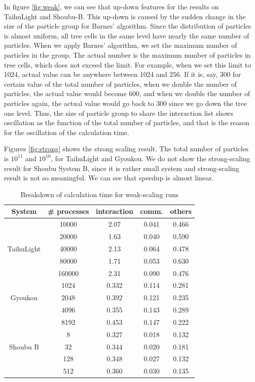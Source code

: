 \documentclass[Afour,sageh,times]{sagej}
\newcommand{\rev}[1]{{#1}}
\begin{document}
\rev{In figure \ref{fig:weak}, we can see that up-down features for
  the results on TaihuLight and Shoubu-B. This up-down is caused by
  the sudden change in the size of the particle group for Barnes'
  algorithm. Since the distribution of particles is almost uniform,
  all tree cells in the same level have nearly the same number of
  particles.  When we apply Barnes' algorithm, we set the maximum
  number of particles in the group.  The actual number is the maximum
  number of particles in tree cells, which does not exceed the limit.
  For example, when we set this limit to 1024, actual value can be
  anywhere between 1024 and 256. If it is, say, 300 for certain value
  of the total number of particles, when we double the number of
  particles, the actual value would become 600, and when we double the
  number of particles again, the actual value would go back to 300
  since we go down the tree one level. Thus, the size of particle
  group to share the interaction list shows oscillation as the
  function of the total number of particles, and that is the reason
  for the oscillation of the calculation time.}

Figures \ref{fig:strong} shows the strong scaling result.  The total
number of particles is $10^{11}$ and $10^{10}$, for TaihuLight and
Gyoukou. We do not show the strong-scaling result for Shoubu System B,
since it is rather small system and strong-scaling result is not so
meaningful.  We can see that speedup is almost linear.


\begin{table}
\centering
  \caption{Breakdown of calculation time for weak-scaling runs}
  \label{tab:timeweak}
  \begin{tabular}{ccccc}
    \hline
 System  & \# processes & interaction & comm. & others\\
    \hline  
&10000 &   2.07& 0.041 & 0.466\\
&20000 &  1.63& 0.040  & 0.590 \\
TaihuLight &40000  &  2.13 & 0.064 & 0.478 \\
&80000 &   1.71 & 0.053 & 0.630\\
&160000 &  2.31& 0.090& 0.476\\
\hline
&1024&  0.332 &  0.114 & 0.281\\
Gyoukou &2048&   0.392 & 0.121 & 0.235\\
&4096&  0.355 & 0.143& 0.289\\
&8192   & 0.453& 0.147&     0.222\\
\hline
        &8&  0.327 &  0.018 & 0.132\\
Shoubu B &32&   0.344 & 0.020 & 0.181\\
        &128&  0.348 & 0.027& 0.132\\
        &512& 0.360& 0.030&     0.135\\
\hline
\end{tabular}
\end{table}
\end{document}
